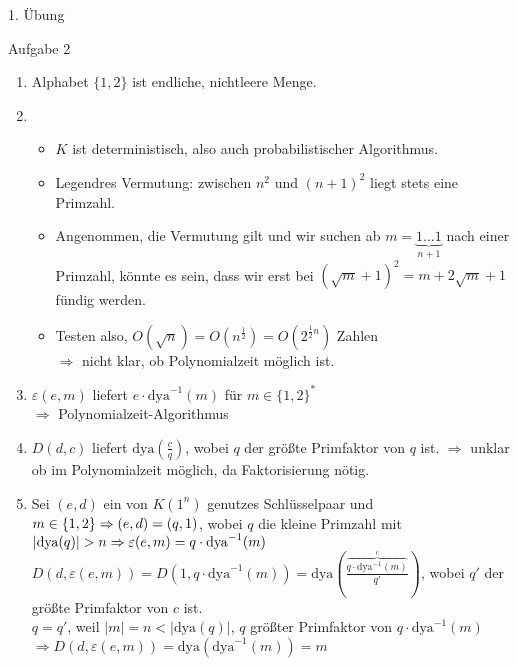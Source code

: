 \begin{section}{1. Übung}
  \begin{subsection}{Aufgabe 2}
   \begin{enumerate}
    \item Alphabet \(\{1,2\}\) ist endliche, nichtleere Menge. \checkmark
    \item \begin{itemize}
           \item \(K\) ist deterministisch, also auch probabilistischer Algorithmus.
           \item Legendres Vermutung: zwischen \(n^2\) und \((n+1)^2\) liegt stets eine Primzahl.
           \item Angenommen, die Vermutung gilt und wir suchen ab \(m = \underbrace{1\hdots1}_{n+1}\) nach einer Primzahl, könnte es sein, dass wir erst bei \((\sqrt{m}+1)^2=m+2\sqrt{m}+1\) fündig werden.
           \item Testen also, \(O(\sqrt{n}) = O(n^{\frac{1}{2}}) = O(2^{\frac{1}{2} n})\) Zahlen \\
           \(\Rightarrow\) nicht klar, ob Polynomialzeit möglich ist.
          \end{itemize}
    \item \(\varepsilon(e,m)\) liefert \(e\cdot \text{dya}^{-1}(m)\) für \(m \in \{1,2\}^*\) \\
    \( \Rightarrow\) Polynomialzeit-Algorithmus \checkmark
    \item \(D(d,c)\) liefert \(\text{dya}(\frac{c}{q})\), wobei \(q\) der größte Primfaktor von \(q\) ist. \(\Rightarrow\) unklar ob im Polynomialzeit möglich, da Faktorisierung nötig.
    \item Sei \((e,d)\) ein von \(K(1^n)\) genutzes Schlüsselpaar und \(m \in \{1,2\} \\ \Rightarrow (e,d) = (q,1)\), wobei \(q\) die kleine Primzahl mit \(|\text{dya}(q)| > n \\ \Rightarrow \varepsilon(e,m) = q\cdot \text{dya}^{-1} (m)\) \\
    \(D(d,\varepsilon(e,m)) = D(1, q\cdot\text{dya}^{-1}(m)) = \text{dya}\left(\frac{\overbrace{q\cdot\text{dya}^{-1}(m)}^{c}}{q'}\right)\), wobei \(q'\) der größte Primfaktor von \(c\) ist. \\
    \(q = q'\), weil \(|m| = n < |\text{dya}(q)|\), \(q\) größter Primfaktor von \(q\cdot\text{dya}^{-1}(m)\) \\
    \(\Rightarrow D(d,\varepsilon(e,m)) = \text{dya}(\text{dya}^{-1}(m)) = m\) \checkmark
   \end{enumerate}


\end{subsection}
\end{section}
